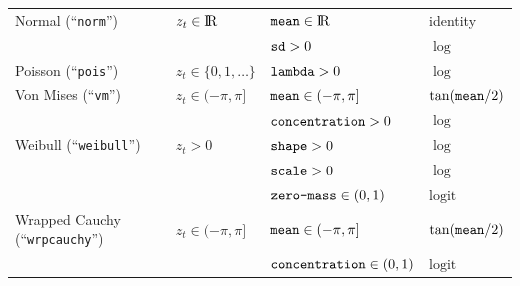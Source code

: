 \documentclass[12pt]{article}\usepackage[]{graphicx}\usepackage[]{color}
\begin{document}
\begin{table}
\begin{tabular}{llll}
  Normal (``\verb|norm|'')             & $z_t\in{\rm I\!R}$       & $\verb|mean|\in{\rm I\!R}$       &  identity \tabularnewline  
                                       &                          & $\verb|sd|>0$                    &  $\log$ \tabularnewline 
  Poisson (``\verb|pois|'')            & $z_t\in\{0,1,\ldots\}$   & $\verb|lambda|>0$                &  $\log$ \tabularnewline  
  Von Mises (``\verb|vm|'')            & $z_t\in(-\pi,\pi]$       & $\verb|mean|\in(-\pi,\pi]$       &  $\tan(\verb|mean|/2)$ \tabularnewline  
                                       &                          & $\verb|concentration|>0$         &  $\log$ \tabularnewline 
  Weibull (``\verb|weibull|'')         & $z_t>0$                  & $\verb|shape|>0$                 &  $\log$ \tabularnewline  
                                       &                          & $\verb|scale|>0$                 &  $\log$ \tabularnewline  
                                       &                          & $\verb|zero-mass|\in(0,1)$       &  $\text{logit}$ \tabularnewline 
  Wrapped Cauchy (``\verb|wrpcauchy|'')& $z_t\in(-\pi,\pi]$       & $\verb|mean|\in(-\pi,\pi]$       &  $\tan(\verb|mean|/2)$ \tabularnewline  
                                       &                          & $\verb|concentration|\in(0,1)$ &  $\text{logit}$ \tabularnewline 
  \bottomrule
  \end{tabular}
\end{table}

\end{document}
